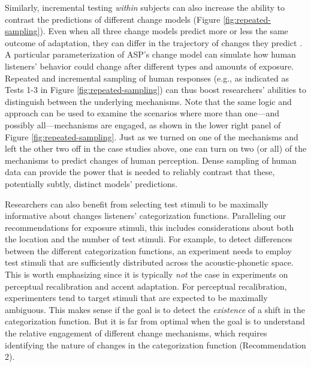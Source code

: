 \documentclass[
  11pt,
  man,floatsintext]{apa6}
\begin{document}
Similarly, incremental testing \emph{within} subjects can also increase the ability to contrast the predictions of different change models (Figure \ref{fig:repeated-sampling}). Even when all three change models predict more or less the same outcome of adaptation, they can differ in the trajectory of changes they predict \autocites[for some pioneering behavioral work, see e.g.,][]{bertelson2003,bonte2017,vroomen2007}[and for computational models, see][]{kleinschmidt-jaeger2012}. A particular parameterization of ASP's change model can simulate how human listeners' behavior could change after different types and amounts of exposure. Repeated and incremental sampling of human responses (e.g., as indicated as Tests 1-3 in Figure \ref{fig:repeated-sampling}) can thus boost researchers' abilities to distinguish between the underlying mechanisms. Note that the same logic and approach can be used to examine the scenarios where more than one---and possibly all---mechanisms are engaged, as shown in the lower right panel of Figure \ref{fig:repeated-sampling}. Just as we turned on one of the mechanisms and left the other two off in the case studies above, one can turn on two (or all) of the mechanisms to predict changes of human perception. Dense sampling of human data can provide the power that is needed to reliably contrast that these, potentially subtly, distinct models' predictions.

Researchers can also benefit from selecting test stimuli to be maximally informative about changes listeners' categorization functions. Paralleling our recommendations for exposure stimuli, this includes considerations about both the location and the number of test stimuli. For example, to detect differences between the different categorization functions, an experiment needs to employ test stimuli that are sufficiently distributed across the acoustic-phonetic space. This is worth emphasizing since it is typically \emph{not} the case in experiments on perceptual recalibration and accent adaptation. For perceptual recalibration, experimenters tend to target stimuli that are expected to be maximally ambiguous. This makes sense if the goal is to detect the \emph{existence} of a shift in the categorization function. But it is far from optimal when the goal is to understand the relative engagement of different change mechanisms, which requires identifying the nature of changes in the categorization function (Recommendation 2).
\end{document}
